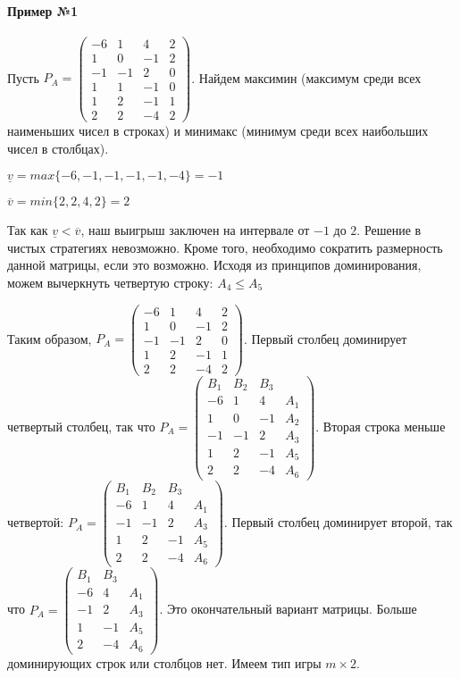 \documentclass{article}
\begin{document}
\paragraph{Пример №1} Пусть $P_{A} = \begin{pmatrix}
    -6 & 1 & 4 & 2\\
    1 & 0 & -1 & 2 \\
    -1 & -1 & 2 & 0\\
    1 & 1 & -1 & 0\\
    1 & 2 & -1 & 1\\
    2 & 2 & -4 & 2
\end{pmatrix}$. Найдем максимин (максимум среди всех наименьших чисел в строках) и минимакс (минимум среди всех наибольших чисел в столбцах).

$\underline{v} = max \{ -6, -1, -1, -1, -1, -4 \} = -1$

$\overline{v} = min \{ 2, 2, 4, 2 \} = 2$

Так как $\underline{v} < \overline{v}$, наш выигрыш заключен на интервале от $-1$ до $2$. Решение в чистых стратегиях невозможно. Кроме того, необходимо сократить размерность данной матрицы, если это возможно. Исходя из принципов доминирования, можем вычеркнуть четвертую строку: $A_{4} \le A_{5}$

Таким образом, $P_{A} = \begin{pmatrix}
    -6 & 1 & 4 & 2\\
    1 & 0 & -1 & 2 \\
    -1 & -1 & 2 & 0\\
    1 & 2 & -1 & 1\\
    2 & 2 & -4 & 2
\end{pmatrix}$. Первый столбец доминирует четвертый столбец, так что $P_{A} = \begin{pmatrix}
    B_{1} & B_{2} & B_{3} \\
    -6 & 1 & 4 & A_{1}\\
    1 & 0 & -1 & A_{2}\\
    -1 & -1 & 2 & A_{3}\\
    1 & 2 & -1 & A_{5}\\
    2 & 2 & -4 & A_{6}
\end{pmatrix}$. Вторая строка меньше четвертой: $P_{A} = \begin{pmatrix}
    B_{1} & B_{2} & B_{3} \\
    -6 & 1 & 4 & A_{1}\\
    -1 & -1 & 2 & A_{3}\\
    1 & 2 & -1 & A_{5}\\
    2 & 2 & -4 & A_{6}
\end{pmatrix}$. Первый столбец доминирует второй, так что $P_{A} = \begin{pmatrix}
    B_{1} & B_{3} \\
    -6 & 4 & A_{1}\\
    -1 & 2 & A_{3}\\
    1 & -1 & A_{5}\\
    2 & -4 & A_{6}
\end{pmatrix}$. Это окончательный вариант матрицы. Больше доминирующих строк или столбцов нет. Имеем тип игры $m \times 2$.
\end{document}
